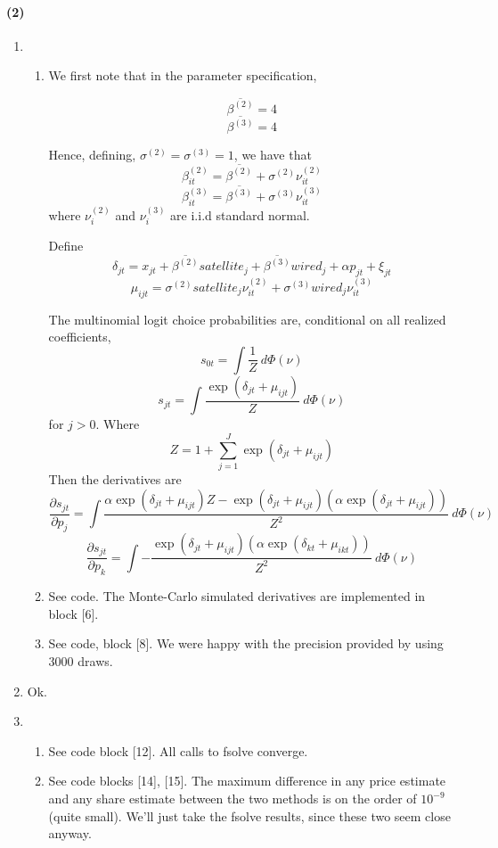 \documentclass[10pt,letter]{article}
\begin{document}
\paragraph{(2)}
\begin{enumerate}[label=(\alph*)]
\item \begin{enumerate}[label=(\roman*)]
\item We first note that in the parameter specification,

\[ \overline{\beta^{(2)}} = 4 \]
\[ \overline{\beta^{(3)}} = 4 \]

Hence, defining, $\sigma^{(2)} = \sigma^{(3)} = 1$, we have that
\[ \beta_{it}^{(2)} = \overline{\beta^{(2)}} + \sigma^{(2)} \nu_{it}^{(2)}  \]
\[ \beta_{it}^{(3)} = \overline{\beta^{(3)}} + \sigma^{(3)} \nu_{it}^{(3)}  \]
where $\nu^{(2)}_i$ and $\nu^{(3)}_i$ are i.i.d standard normal.

Define
\[ \delta_{jt} = x_{jt} + \overline{\beta^{(2)}}satellite_j +\overline{\beta^{(3)}}wired_j + \alpha p_{jt} + \xi_{jt} \]
\[ \mu_{ijt} = \sigma^{(2)}satellite_j \nu_{it}^{(2)}  + \sigma^{(3)}wired_j \nu_{it}^{(3)}  \]

The multinomial logit choice probabilities are, conditional on all realized coefficients,
\[ s_{0t} = \int \frac{1}{Z} \ d\Phi(\nu) \]
\[ s_{jt} = \int\frac{\exp(\delta_{jt} + \mu_{ijt})}{Z} \ d\Phi(\nu)  \]
for $j > 0$. Where
\[ Z = 1 + \sum_{j=1}^J \exp(\delta_{jt} + \mu_{ijt}) \]
Then the derivatives are
\[ \frac{\partial s_{jt}}{\partial p_j} = \int\frac{\alpha \exp(\delta_{jt} + \mu_{ijt}) Z - \exp(\delta_{jt} + \mu_{ijt})\left(\alpha\exp(\delta_{jt} + \mu_{ijt})\right)}{Z^2} \ d\Phi(\nu)  \]
\[ \frac{\partial s_{jt}}{\partial p_k} = \int-\frac{\exp(\delta_{jt} + \mu_{ijt})\left(\alpha\exp(\delta_{kt} + \mu_{ikt})\right)}{Z^2} \ d\Phi(\nu)  \]
\item See code. The Monte-Carlo simulated derivatives are implemented in block [6].
\item See code, block [8]. We were happy with the precision provided by using $3000$ draws.
\end{enumerate}
\item Ok.
\item \begin{enumerate}[label=(\roman*)]
  \item See code block [12]. All calls to fsolve converge.
  \item See code blocks [14], [15]. The maximum difference in any price estimate and any share estimate between the two methods is on the order of $10^{-9}$ (quite small). We'll just take the fsolve results, since these two seem close anyway.
\end{enumerate}
\end{enumerate}
\end{document}
